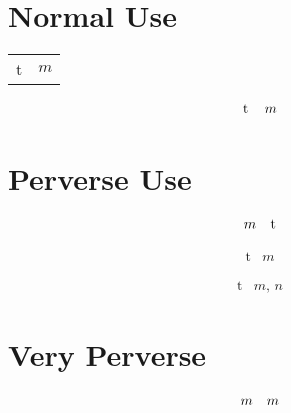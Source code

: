 \documentclass{article}
\begin{document}
\section{Normal Use}
\begin{tabular}{cc}
t & $m$ 
\end{tabular}

\[\begin{tabular}{cc}
t & $m$ 
\end{tabular}\]

\section{Perverse Use}
\[ \begin{array}{cc}
m & $t$
\end{array}\]

\[ \begin{array}{cc}
\mbox{t} & \mbox{$m$}
\end{array}\]

\[ \begin{array}{cc}
\mbox{t} & \mbox{$m$, $n$}
\end{array}\]

\section{Very Perverse}
\[ \begin{array}{cc}
m & $\hbox{$m$}$
\end{array}\]
\end{document}
